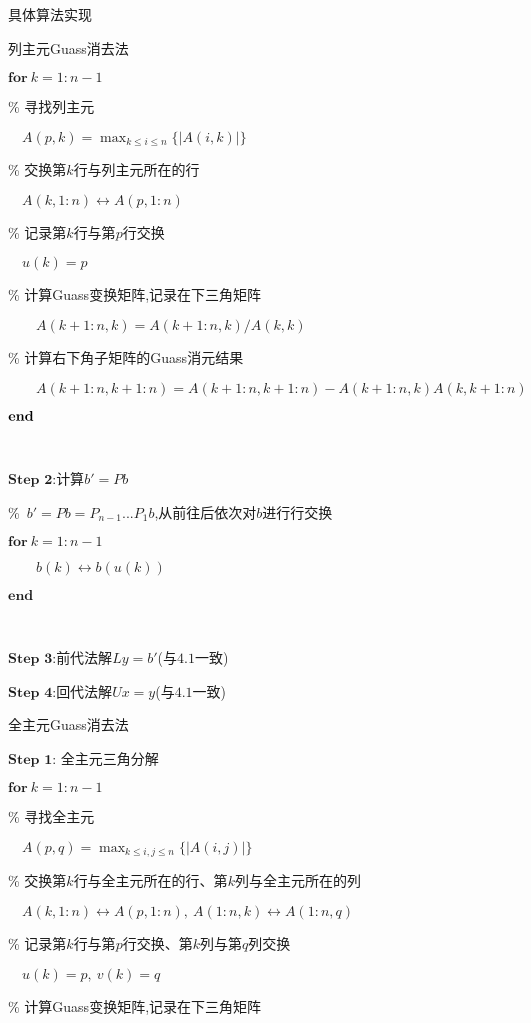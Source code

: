 \documentclass{article}
\begin{document}
\begin{section}{具体算法实现}
\begin{subsection}{列主元Guass消去法}
{    $\textbf{for}\ k=1:n-1$

        \% 寻找列主元

    $\quad A(p,k) = \max_{k\leq i\leq n}\{\left\lvert A(i,k)\right\rvert \}$

     \% 交换第$k$行与列主元所在的行

    $\quad A(k,1:n)\leftrightarrow A(p,1:n)$

    \% 记录第$k$行与第$p$行交换

    $\quad u(k)=p$

    \% 计算Guass变换矩阵,记录在下三角矩阵

    $\qquad A(k+1:n,k) = A(k+1:n,k)/A(k,k)$
         
    \% 计算右下角子矩阵的Guass消元结果

    $\qquad A(k+1:n,k+1:n) = A(k+1:n,k+1:n) - A(k+1:n,k)A(k,k+1:n)$

    $\bf{end}$

    \ 

    \noindent $\textbf{Step\ 2:}$计算$b'=Pb$

    \%\ $b'=Pb=P_{n-1}...P_1b$,从前往后依次对$b$进行行交换

    $\textbf{for}\ k=1:n-1$

    $\qquad b(k)\leftrightarrow b(u(k))$

    $\textbf{end}$

    \ 

    \noindent $\textbf{Step\ 3:}$前代法解$Ly=b'$(与$4.1$一致)

    \noindent $\textbf{Step\ 4:}$回代法解$Ux=y$(与$4.1$一致)
        }
    \end{subsection}
    \begin{subsection}{全主元Guass消去法}
        \small{
    \noindent$\textbf{Step\ 1:}$ 全主元三角分解
        
    $\textbf{for}\ k=1:n-1$

        \% 寻找全主元

    $\quad A(p,q) = \max_{k\leq i,j\leq n}\{\left\lvert A(i,j)\right\rvert \}$

     \% 交换第$k$行与全主元所在的行、第$k$列与全主元所在的列

    $\quad A(k,1:n)\leftrightarrow A(p,1:n),\ A(1:n,k)\leftrightarrow A(1:n,q)$

    \% 记录第$k$行与第$p$行交换、第$k$列与第$q$列交换

    $\quad u(k)=p,\ v(k)=q$

    \% 计算Guass变换矩阵,记录在下三角矩阵

}
\end{subsection}
\end{section}
\end{document}
